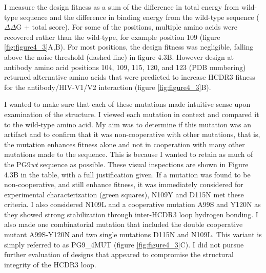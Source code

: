 I measure the design fitness as a sum of the difference in total energy from wild-type sequence and the difference in binding energy from the wild-type sequence ($\Delta\Delta$G + total score). For some of the positions, multiple amino acids were recovered rather than the wild-type, for example position 109 (figure \ref{fig:figure4_3}A,B). For most positions, the design fitness was negligible, falling above the noise threshold (dashed line) in figure 4.3B. However design at antibody amino acid positions 104, 109, 115, 120, and 123 (PDB numbering) returned alternative amino acids that were predicted to increase HCDR3 fitness for the antibody/HIV-V1/V2 interaction (figure \ref{fig:figure4_3}B).

I wanted to make sure that each of these mutations made intuitive sense upon examination of the structure. I viewed each mutation in context and compared it to the wild-type amino acid. My aim was to determine if this mutation was an artifact and to confirm that it was non-cooperative with other mutations, that is, the mutation enhances fitness alone and not in cooperation with many other mutations made to the sequence. This is because I wanted to retain as much of the PG9\textit{wt} sequence as possible. These visual inspections are shown in Figure 4.3B in the table, with a full justification given. If a mutation was found to be non-cooperative, and still enhance fitness, it was immediately considered for experimental characterization (green squares), N109Y and D115N met these criteria. I also considered N109L and a cooperative mutation A99S and Y120N as they showed strong stabilization through inter-HCDR3 loop hydrogen bonding. I also made one combinatorial mutation that included the double cooperative mutant A99S-Y120N and two single mutations D115N and N109L. This variant is simply referred to as PG9\_4MUT (figure \ref{fig:figure4_3}C). I did not pursue further evaluation of designs that appeared to compromise the structural integrity of the HCDR3 loop.

